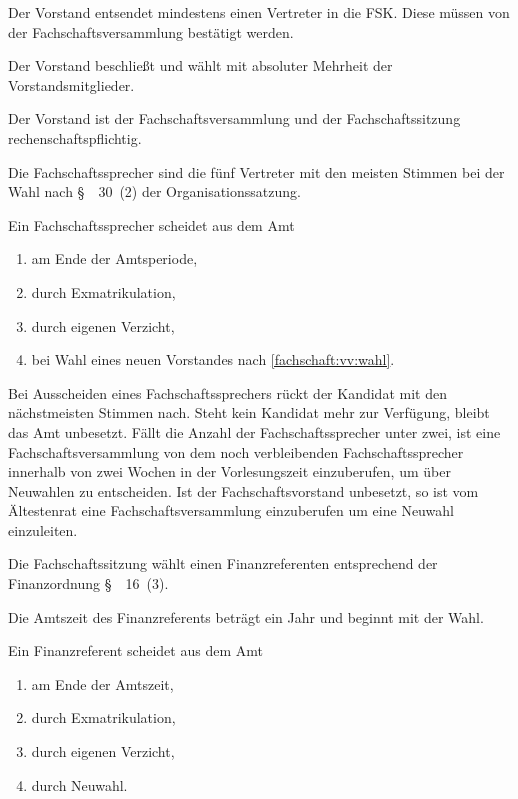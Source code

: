 \documentclass[a4paper, parskip=half, numbers=noenddot]{scrartcl}
\begin{document}
\begin{contract}
Der Vorstand entsendet mindestens einen Vertreter in die FSK. Diese müssen von der Fachschaftsversammlung bestätigt werden.

Der Vorstand beschließt und wählt mit absoluter Mehrheit der Vorstandsmitglieder.

Der Vorstand ist der Fachschaftsversammlung und der Fachschaftssitzung rech\-en\-schafts\-pflichtig.


%
%

%
\label{fs:sprecher}

Die Fachschaftssprecher sind die fünf Vertreter mit den meisten Stimmen bei der Wahl nach §~~30~(2) der Organisationssatzung.

Ein Fachschaftssprecher scheidet aus dem Amt
  \begin{enumerate}
  \item am Ende der Amtsperiode,
  \item durch Exmatrikulation,
  \item durch eigenen Verzicht,
  \item bei Wahl eines neuen Vorstandes nach \ref{fachschaft:vv:wahl}.
\end{enumerate}

Bei Ausscheiden eines Fach\-schaftssprechers rückt der Kandidat mit den nächstmeisten Stimmen nach. Steht kein Kandidat mehr zur Verfügung, bleibt das Amt unbesetzt. Fällt die Anzahl der Fachschaftssprecher unter zwei, ist eine Fachschaftsversammlung von dem noch verbleibenden Fachschaftssprecher innerhalb von zwei Wochen in der Vorlesungszeit einzuberufen, um über Neuwahlen zu entscheiden. Ist der Fachschaftsvorstand unbesetzt, so ist vom Ältestenrat eine Fachschaftsversammlung einzuberufen um eine Neuwahl einzuleiten.


%
%


Die Fachschaftssitzung wählt einen Finanzreferenten entsprechend der Finanzordnung §~~16~(3).

Die Amtszeit des Finanzreferents beträgt ein Jahr und beginnt mit der Wahl.

Ein Finanzreferent scheidet aus dem Amt
\begin{enumerate}
\item am Ende der Amtszeit,
\item durch Exmatrikulation,
\item durch eigenen Verzicht,
\item durch Neuwahl.
\end{enumerate}


\end{contract}
\end{document}
